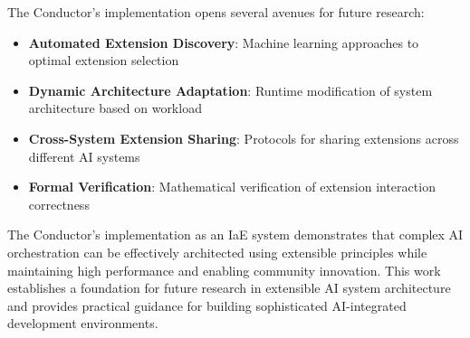 The Conductor's implementation opens several avenues for future research:

\begin{itemize}
    \item \textbf{Automated Extension Discovery}: Machine learning approaches to optimal extension selection
    \item \textbf{Dynamic Architecture Adaptation}: Runtime modification of system architecture based on workload
    \item \textbf{Cross-System Extension Sharing}: Protocols for sharing extensions across different AI systems
    \item \textbf{Formal Verification}: Mathematical verification of extension interaction correctness
\end{itemize}

The Conductor's implementation as an IaE system demonstrates that complex AI orchestration can be effectively architected using extensible principles while maintaining high performance and enabling community innovation. This work establishes a foundation for future research in extensible AI system architecture and provides practical guidance for building sophisticated AI-integrated development environments.
